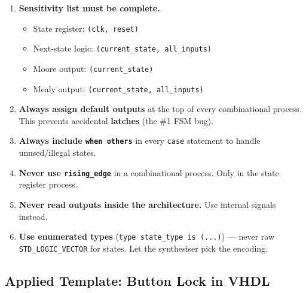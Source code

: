 \documentclass[12pt,a4paper]{article}
\begin{document}
\begin{importantbox}
\begin{enumerate}
  \item \textbf{Sensitivity list must be complete.}
    \begin{itemize}
      \item State register: \texttt{(clk, reset)}
      \item Next-state logic: \texttt{(current\_state, all\_inputs)}
      \item Moore output: \texttt{(current\_state)}
      \item Mealy output: \texttt{(current\_state, all\_inputs)}
    \end{itemize}

  \item \textbf{Always assign default outputs} at the top of every combinational process. This prevents accidental \textbf{latches} (the \#1 FSM bug).

  \item \textbf{Always include \texttt{when others}} in every \texttt{case} statement to handle unused/illegal states.

  \item \textbf{Never use \texttt{rising\_edge}} in a combinational process. Only in the state register process.

  \item \textbf{Never read outputs inside the architecture.} Use internal signals instead.

  \item \textbf{Use enumerated types} (\texttt{type state\_type is (...)}) --- never raw \texttt{STD\_LOGIC\_VECTOR} for states. Let the synthesiser pick the encoding.
\end{enumerate}
\end{importantbox}

\subsection{Applied Template: Button Lock in VHDL}
\end{document}
